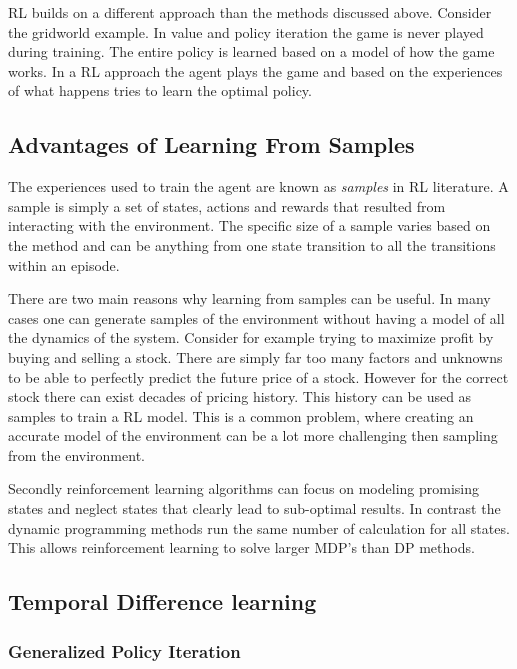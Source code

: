 RL builds on a different approach than the methods discussed above. Consider the gridworld example. In value and policy iteration the game is never played during training. The entire policy is learned based on a model of how the game works. In a RL approach the agent plays the game and based on the experiences of what happens tries to learn the optimal policy.

\subsection{Advantages of Learning From Samples}

The experiences used to train the agent are known as \textit{samples} in RL literature. A sample is simply a set of states, actions and rewards that resulted from interacting with the environment. The specific size of a sample varies based on the method and can be anything from one state transition to all the transitions within an episode.

There are two main reasons why learning from samples can be useful. In many cases one can generate samples of the environment without having a model of all the dynamics of the system. Consider for example trying to maximize profit by buying and selling a stock. There are simply far too many factors and unknowns to be able to perfectly predict the future price of a stock. However for the correct stock there can exist decades of pricing history. This history can be used as samples to train a RL model. This is a common problem, where creating an accurate model of the environment can be a lot more challenging then sampling from the environment.

Secondly reinforcement learning algorithms can focus on modeling promising states and neglect states that clearly lead to sub-optimal results. In contrast the dynamic programming methods run the same number of calculation for all states. This allows reinforcement learning to solve larger MDP's than DP methods. \citep[p.~115]{sutton_barto_2018}

\subsection{Temporal Difference learning}

\subsubsection{Generalized Policy Iteration}

